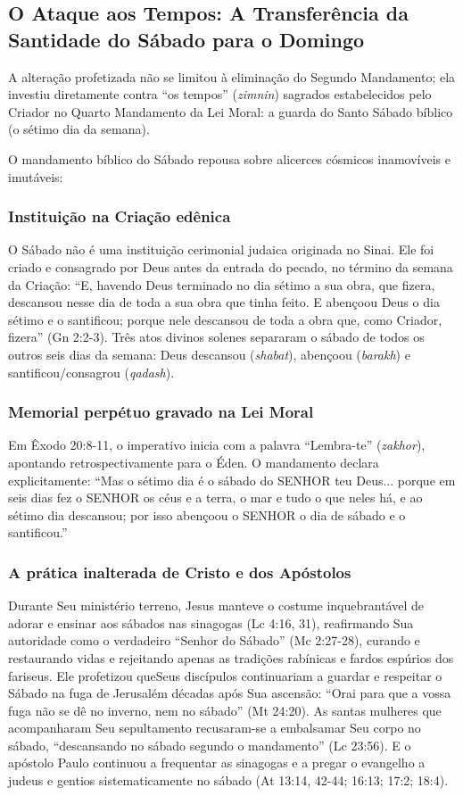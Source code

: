 \subsection{O Ataque aos Tempos: A Transferência da Santidade do Sábado para o Domingo}


A alteração profetizada não se limitou à eliminação do Segundo Mandamento; ela investiu diretamente contra ``os tempos'' (\textit{zimnin}) sagrados estabelecidos pelo Criador no Quarto Mandamento da Lei Moral: a guarda do Santo Sábado bíblico (o sétimo dia da semana).

O mandamento bíblico do Sábado repousa sobre alicerces cósmicos inamovíveis e imutáveis:

\subsubsection*{Instituição na Criação edênica}
O Sábado não é uma instituição cerimonial judaica originada no Sinai. Ele foi criado e consagrado por Deus antes da entrada do pecado, no término da semana da Criação: ``E, havendo Deus terminado no dia sétimo a sua obra, que fizera, descansou nesse dia de toda a sua obra que tinha feito. E abençoou Deus o dia sétimo e o santificou; porque nele descansou de toda a obra que, como Criador, fizera'' (Gn 2:2-3). Três atos divinos solenes separaram o sábado de todos os outros seis dias da semana: Deus descansou (\textit{shabat}), abençoou (\textit{barakh}) e santificou/consagrou (\textit{qadash}).

\subsubsection*{Memorial perpétuo gravado na Lei Moral}
Em Êxodo 20:8-11, o imperativo inicia com a palavra ``Lembra-te'' (\textit{zakhor}), apontando retrospectivamente para o Éden. O mandamento declara explicitamente: ``Mas o sétimo dia é o sábado do SENHOR teu Deus... porque em seis dias fez o SENHOR os céus e a terra, o mar e tudo o que neles há, e ao sétimo dia descansou; por isso abençoou o SENHOR o dia de sábado e o santificou.''

\subsubsection*{A prática inalterada de Cristo e dos Apóstolos}
Durante Seu ministério terreno, Jesus manteve o costume inquebrantável de adorar e ensinar aos sábados nas sinagogas (Lc 4:16, 31), reafirmando Sua autoridade como o verdadeiro ``Senhor do Sábado'' (Mc 2:27-28), curando e restaurando vidas e rejeitando apenas as tradições rabínicas e fardos espúrios dos fariseus. Ele profetizou queSeus discípulos continuariam a guardar e respeitar o Sábado na fuga de Jerusalém décadas após Sua ascensão: ``Orai para que a vossa fuga não se dê no inverno, nem no sábado'' (Mt 24:20). As santas mulheres que acompanharam Seu sepultamento recusaram-se a embalsamar Seu corpo no sábado, ``descansando no sábado segundo o mandamento'' (Lc 23:56). E o apóstolo Paulo continuou a frequentar as sinagogas e a pregar o evangelho a judeus e gentios sistematicamente no sábado (At 13:14, 42-44; 16:13; 17:2; 18:4).

